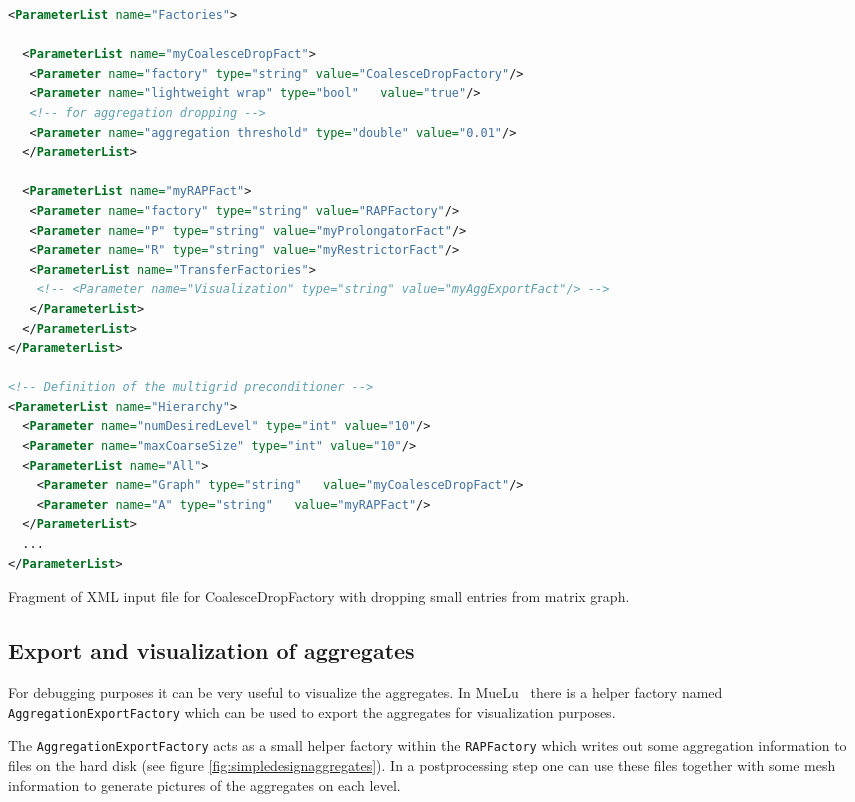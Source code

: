 \documentclass[12pt,a4paper]{article}
\newcommand{\MueLu}{MueLu}
\begin{document}
\begin{Listing}
\begin{center}
\begin{lstlisting}[language=xml]
<ParameterList name="Factories">

  <ParameterList name="myCoalesceDropFact">
   <Parameter name="factory" type="string" value="CoalesceDropFactory"/>
   <Parameter name="lightweight wrap" type="bool"   value="true"/>
   <!-- for aggregation dropping -->
   <Parameter name="aggregation threshold" type="double" value="0.01"/>
  </ParameterList>

  <ParameterList name="myRAPFact">
   <Parameter name="factory" type="string" value="RAPFactory"/>
   <Parameter name="P" type="string" value="myProlongatorFact"/>
   <Parameter name="R" type="string" value="myRestrictorFact"/>
   <ParameterList name="TransferFactories">
    <!-- <Parameter name="Visualization" type="string" value="myAggExportFact"/> -->
   </ParameterList>
  </ParameterList>
</ParameterList>

<!-- Definition of the multigrid preconditioner -->
<ParameterList name="Hierarchy">
  <Parameter name="numDesiredLevel" type="int" value="10"/>
  <Parameter name="maxCoarseSize" type="int" value="10"/>
  <ParameterList name="All">
    <Parameter name="Graph" type="string"   value="myCoalesceDropFact"/>
    <Parameter name="A" type="string"   value="myRAPFact"/>
  </ParameterList>
  ...
</ParameterList>
\end{lstlisting}
\caption{Fragment of XML input file for CoalesceDropFactory with dropping small entries from matrix graph.}
\label{listing:CoalesceDropFactory}
\end{center}
\end{Listing}

\subsection{Export and visualization of aggregates}
For debugging purposes it can be very useful to visualize the aggregates. In \MueLu~ there is a helper factory named \verb|AggregationExportFactory| which can be used to export the aggregates for visualization purposes.

The \verb|AggregationExportFactory| acts as a small helper factory within the \verb|RAPFactory| which writes out some aggregation information to files on the hard disk (see figure \ref{fig:simpledesignaggregates}). In a postprocessing step one can use these files together with some mesh information to generate pictures of the aggregates on each level.
\end{document}
